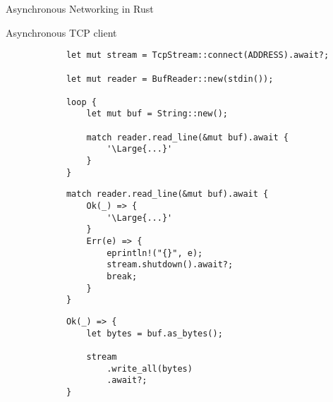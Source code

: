 \begin{frame}[fragile]{Asynchronous Networking in Rust}
    \begin{block}{Asynchronous TCP client}
        \begin{overprint}
            \begin{verbatim}
            let mut stream = TcpStream::connect(ADDRESS).await?;

            let mut reader = BufReader::new(stdin());
            
            loop {
                let mut buf = String::new();
            
                match reader.read_line(&mut buf).await {
                    '\Large{...}'
                }
            }
            \end{verbatim}

            \begin{verbatim}
            match reader.read_line(&mut buf).await {
                Ok(_) => {
                    '\Large{...}'
                }
                Err(e) => {
                    eprintln!("{}", e);
                    stream.shutdown().await?;
                    break;
                }
            }
            \end{verbatim}

            \begin{verbatim}
            Ok(_) => {
                let bytes = buf.as_bytes();
    
                stream
                    .write_all(bytes)
                    .await?;
            }
            \end{verbatim}
        \end{overprint}
    \end{block}
\end{frame}
